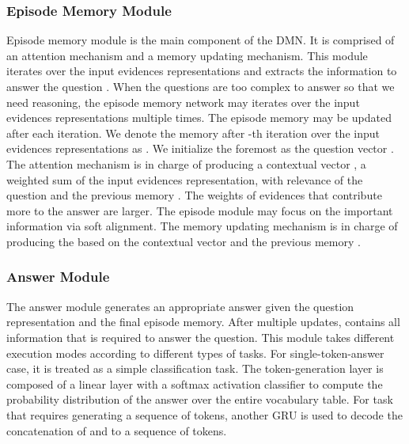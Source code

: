 \documentclass[conference]{IEEEtran}
\begin{document}
	\subsubsection{Episode Memory Module}
	Episode memory module is the main component of the DMN. It is comprised of an attention mechanism and a memory updating mechanism. This module iterates over the input evidences representations and extracts the information to answer the question . When the questions are too complex to answer so that we need reasoning, the episode memory network may iterates over the input evidences representations multiple times. The episode memory may be updated after each iteration. We denote the memory after -th iteration over the input evidences representations as . We initialize the foremost  as the question vector . The attention mechanism is in charge of producing a contextual vector , a weighted sum of the input evidences representation, with relevance of the question  and the previous memory . The weights of evidences that contribute more to the answer are larger. The episode module may focus on the important information via soft alignment. The memory updating mechanism is in charge of producing the  based on the contextual vector  and the previous memory . 
	\subsubsection{Answer Module}
	The answer module generates an appropriate answer given the question representation  and the final episode memory. After multiple updates,  contains all information that is required to answer the question. This module takes different execution modes according to different types of tasks. For single-token-answer case, it is treated as a simple classification task. The token-generation layer is composed of a linear layer with a softmax activation classifier to compute the probability distribution of the answer over the entire vocabulary table. For task that requires generating a sequence of tokens, another GRU is used to decode the concatenation of  and  to a sequence of tokens.
	
\end{document}

